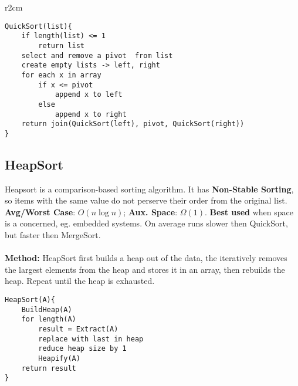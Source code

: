 \documentclass{article}
\newcommand{\thickbox}[1]{\setlength{\fboxrule}{1.3pt}\fbox{#1}\setlength{\fboxrule}{0.4pt}}
\begin{document}
\begin{wrapfigure}{r}{2cm}
\end{wrapfigure}

\begin{lstlisting}[style=pseudo]
QuickSort(list){
	if length(list) <= 1
		return list
	select and remove a pivot  from list
	create empty lists -> left, right
	for each x in array
		if x <= pivot
			append x to left
		else
			append x to right
	return join(QuickSort(left), pivot, QuickSort(right))
}
\end{lstlisting}


\clearpage
\subsection{HeapSort}

Heapsort is a comparison-based sorting algorithm. It has {\bf Non-Stable Sorting}, so items with the same value do not perserve their order from the original list. {\bf Avg/Worst Case}: $O(n \log n)$; {\bf Aux. Space}: $\Omega(1)$. {\bf Best used} when space is a concerned, eg. embedded systems. On average runs slower then QuickSort, but faster then MergeSort.
\\ \\
{\bf Method:} HeapSort first builds a heap out of the data, the iteratively removes the largest elements from the heap and stores it in an array, then rebuilds the heap. Repeat until the heap is exhausted.
\begin{lstlisting}[style=pseudo]
HeapSort(A){
	BuildHeap(A)
	for length(A)
		result = Extract(A)
		replace with last in heap
		reduce heap size by 1
		Heapify(A)
	return result
}
\end{lstlisting}
\end{document}
